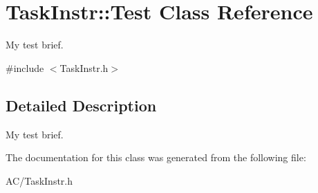 \hypertarget{class_task_instr_1_1_test}{\section{Task\-Instr\-:\-:Test Class Reference}
\label{class_task_instr_1_1_test}
}


My test brief.  




{\ttfamily \#include $<$Task\-Instr.\-h$>$}



\subsection{Detailed Description}
My test brief. 

The documentation for this class was generated from the following file\-:\begin{DoxyCompactItemize}
\item 
A\-C/Task\-Instr.\-h\end{DoxyCompactItemize}
